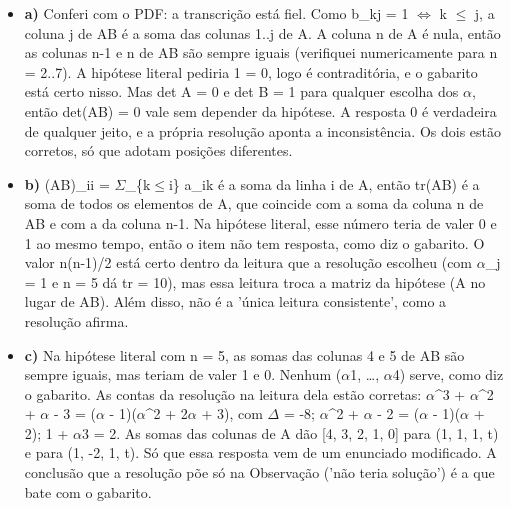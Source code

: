 \documentclass{article}%
\begin{document}
\begin{itemize}%
\item%
\textbf{a)} Conferi com o PDF: a transcrição está fiel. Como b\_kj = 1 $\Leftrightarrow$ k $\leq$ j, a coluna j de AB é a soma das colunas 1..j de A. A coluna n de A é nula, então as colunas n-1 e n de AB são sempre iguais (verifiquei numericamente para n = 2..7). A hipótese literal pediria 1 = 0, logo é contraditória, e o gabarito está certo nisso. Mas det A = 0 e det B = 1 para qualquer escolha dos $\alpha$, então det(AB) = 0 vale sem depender da hipótese. A resposta 0 é verdadeira de qualquer jeito, e a própria resolução aponta a inconsistência. Os dois estão corretos, só que adotam posições diferentes.%
\item%
\textbf{b)} (AB)\_ii = $\Sigma$\_\{k$\leq$i\} a\_ik é a soma da linha i de A, então tr(AB) é a soma de todos os elementos de A, que coincide com a soma da coluna n de AB e com a da coluna n-1. Na hipótese literal, esse número teria de valer 0 e 1 ao mesmo tempo, então o item não tem resposta, como diz o gabarito. O valor n(n-1)/2 está certo dentro da leitura que a resolução escolheu (com $\alpha$\_j = 1 e n = 5 dá tr = 10), mas essa leitura troca a matriz da hipótese (A no lugar de AB). Além disso, não é a 'única leitura consistente', como a resolução afirma.%
\item%
\textbf{c)} Na hipótese literal com n = 5, as somas das colunas 4 e 5 de AB são sempre iguais, mas teriam de valer 1 e 0. Nenhum ($\alpha$1, \ldots{}, $\alpha$4) serve, como diz o gabarito. As contas da resolução na leitura dela estão corretas: $\alpha$\^{}3 + $\alpha$\^{}2 + $\alpha$ - 3 = ($\alpha$ - 1)($\alpha$\^{}2 + 2$\alpha$ + 3), com $\Delta$ = -8; $\alpha$\^{}2 + $\alpha$ - 2 = ($\alpha$ - 1)($\alpha$ + 2); 1 + $\alpha$3 = 2. As somas das colunas de A dão {[}4, 3, 2, 1, 0{]} para (1, 1, 1, t) e para (1, -2, 1, t). Só que essa resposta vem de um enunciado modificado. A conclusão que a resolução põe só na Observação ('não teria solução') é a que bate com o gabarito.%
\end{itemize}%
\end{document}
